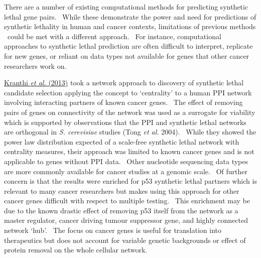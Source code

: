 There are a number of existing computational methods for predicting
synthetic lethal gene pairs. \ While these demonstrate the power and
need for predictions of synthetic lethality in human and cancer
contexts, limitations of previous methods \ could be met with a
different approach. \ For instance, computational approaches to
synthetic lethal prediction are often difficult to interpret, replicate
for new genes, or reliant on data types not available for genes that
other cancer researchers work on. \ 


\hyperlink{ENREF59}{Kranthi}\hyperlink{ENREF59}{\textit{ et
al.}}\hyperlink{ENREF59}{ (2013)} took a network approach to discovery
of synthetic lethal candidate selection applying the concept to
{\textquoteleft}centrality{\textquoteright} to a human PPI network
involving interacting partners of known cancer genes. \ The effect of
removing pairs of genes on connectivity of the network was used as a
surrogate for viability which is supported by observations that the PPI
and synthetic lethal networks are orthogonal in \textit{S. cerevisiae}
studies (Tong\textit{ et al.} 2004). \ While they showed the power law
distribution expected of a scale-free synthetic lethal network with
centrality measures, their approach was limited to known cancer genes
and is not applicable to genes without PPI data. \ Other nucleotide
sequencing data types are more commonly available for cancer studies at
a genomic scale. \ Of further concern is that the results were enriched
for p53 synthetic lethal partners which is relevant to many cancer
researchers but makes using this approach for other cancer genes
difficult with respect to multiple testing. \ This enrichment may be
due to the known drastic effect of removing p53 itself from the network
as a master regulator, cancer driving tumour suppressor gene, and
highly connected network {\textquoteleft}hub{\textquoteright}. \ The
focus on cancer genes is useful for translation into therapeutics but
does not account for variable genetic backgrounds or effect of protein
removal on the whole cellular network. \ 


